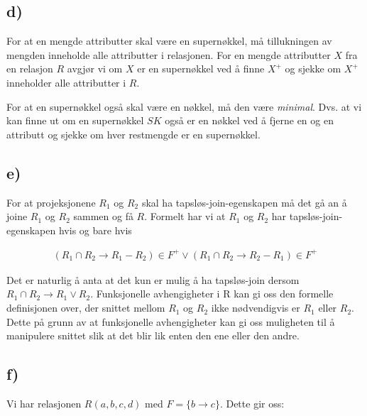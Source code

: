 \documentclass[a4paper, 12pt] {article}
\begin{document}
\subsection{d)}

For at en mengde attributter skal være en supernøkkel, må tillukningen av mengden inneholde alle attributter i relasjonen. For en mengde attributter $X$ fra en relasjon $R$ avgjør vi om $X$ er en supernøkkel ved å finne $X^+$ og sjekke om $X^+$ inneholder alle attributter i $R$.

For at en supernøkkel også skal være en nøkkel, må den være \textit{minimal}. Dvs. at vi kan finne ut om en supernøkkel $SK$ også er en nøkkel ved å fjerne en og en attributt og sjekke om hver restmengde er en supernøkkel.

\subsection{e)}

For at projeksjonene $R_1$ og $R_2$ skal ha tapsløs-join-egenskapen må det gå an å joine $R_1$ og $R_2$ sammen og få $R$. Formelt har vi at $R_1$ og $R_2$ har tapsløs-join-egenskapen hvis og bare hvis

\begin{gather*}
(R_1 \cap R_2 \rightarrow R_1 - R_2 ) \in F^+ \vee (R_1 \cap R_2 \rightarrow R_2 - R_1) \in F^+
\end{gather*}

Det er naturlig å anta at det kun er mulig å ha tapsløs-join dersom $R_1 \cap R_2 \rightarrow R_1 \vee R_2$. Funksjonelle avhengigheter i R kan gi oss den formelle definisjonen over, der snittet mellom $R_1$ og $R_2$ ikke nødvendigvis er $R_1$ eller $R_2$. Dette på grunn av at funksjonelle avhengigheter kan gi oss muligheten til å manipulere snittet slik at det blir lik enten den ene eller den andre.

\subsection{f)}

Vi har relasjonen $R(a,b,c,d)$ med $F = \{b \rightarrow c\}$. Dette gir oss:
\end{document}
